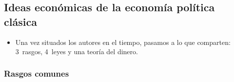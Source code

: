 \documentclass[11pt]{article}
\begin{document}
\subsection{Ideas económicas de la economía política clásica}\label{sec:ideas}

\begin{itemize}
\item Una vez situados los autores en el tiempo, pasamos a lo que comparten: 3~rasgos, 4~leyes y una teoría del dinero.
\end{itemize}

\subsubsection{Rasgos comunes}\label{sec:rasgos}
\end{document}
